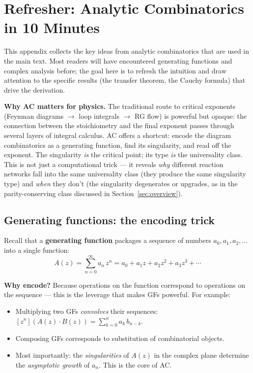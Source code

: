 \documentclass[11pt,a4paper]{article}
\theoremstyle{definition}
\begin{document}
\clearpage
\appendix

\section{Refresher: Analytic Combinatorics in 10 Minutes}
\label{app:ac_tutorial}

This appendix collects the key ideas from analytic combinatorics
that are used in the main text. Most readers will have encountered
generating functions and complex analysis before; the goal here is
to refresh the intuition and draw attention to the specific results
(the transfer theorem, the Cauchy formula) that drive the derivation.

\textbf{Why AC matters for physics.} The traditional route to critical
exponents (Feynman diagrams $\to$ loop integrals $\to$ RG flow) is
powerful but opaque: the connection between the stoichiometry and the
final exponent passes through several layers of integral calculus.
AC offers a shortcut: encode the diagram combinatorics as a generating
function, find its singularity, and read off the exponent. The singularity
\emph{is} the critical point; its type \emph{is} the universality class.
This is not just a computational trick --- it reveals \emph{why} different
reaction networks fall into the same universality class (they produce the
same singularity type) and \emph{when} they don't (the singularity
degenerates or upgrades, as in the parity-conserving class discussed in
Section~\ref{sec:overview}).

\subsection{Generating functions: the encoding trick}

Recall that a \textbf{generating function} packages a sequence of
numbers $a_0, a_1, a_2, \ldots$ into a single function:
\[
A(z) = \sum_{n=0}^\infty a_n\, z^n = a_0 + a_1 z + a_2 z^2 + a_3 z^3 + \cdots
\]

\textbf{Why encode?} Because operations on the function correspond to
operations on the sequence --- this is the leverage that makes GFs
powerful. For example:
\begin{itemize}
\item Multiplying two GFs \emph{convolves} their sequences:
      $[z^n](A(z) \cdot B(z)) = \sum_{k=0}^n a_k\, b_{n-k}$.
\item Composing GFs corresponds to substitution of combinatorial objects.
\item Most importantly: the \emph{singularities} of $A(z)$ in the
      complex plane determine the \emph{asymptotic growth} of $a_n$.
      This is the core of AC.
\end{itemize}
\end{document}

